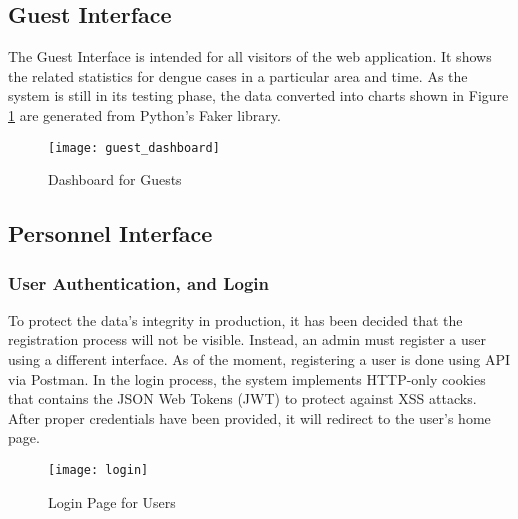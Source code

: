 \subsection{Guest Interface}
The Guest Interface is intended for all visitors of the web application. It shows the related statistics for dengue cases in a particular area and time. As the system is still in its testing phase, the data converted into charts shown in Figure \ref{fig:guest_dashboard} are generated from Python's Faker library. 
\begin{figure}[H]
	\centering
	\texttt{[image: guest\_dashboard]}
	\caption{Dashboard for Guests}
	\label{fig:guest_dashboard}
\end{figure}
\subsection{Personnel Interface}
\subsubsection{User Authentication, and Login}
To protect the data's integrity in production, it has been decided that the registration process will not be visible. Instead, an admin must register a user using a different interface. As of the moment, registering a user is done using API via Postman. In the login process, the system implements HTTP-only cookies that contains the JSON Web Tokens (JWT) to protect against XSS attacks. After proper credentials have been provided, it will redirect to the user's home page.
\begin{figure}[H]
	\centering
	\texttt{[image: login]}
	\caption{Login Page for Users}
	\label{fig:login_page}
\end{figure}
